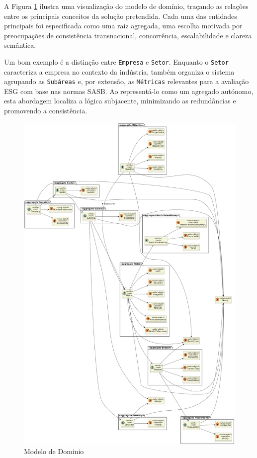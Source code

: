 A Figura \ref{fig:domain_model} ilustra uma visualização do modelo de domínio, traçando as relações entre os principais conceitos da solução pretendida. Cada uma das entidades principais foi especificada como uma raiz agregada, uma escolha motivada por preocupações de consistência transnacional, concorrência, escalabilidade e clareza semântica.

Um bom exemplo é a distinção entre \texttt{Empresa} e \texttt{Setor}. Enquanto o \texttt{Setor} caracteriza a empresa no contexto da indústria, também organiza o sistema agrupando as \texttt{Subáreas} e, por extensão, as \texttt{Métricas} relevantes para a avaliação ESG com base nas normas SASB. Ao representá-lo como um agregado autónomo, esta abordagem localiza a lógica subjacente, minimizando as redundâncias e promovendo a consistência.

\begin{figure}[H]
\centering
    \includegraphics[width=\linewidth,keepaspectratio]{frontmatter/assets/diagrams/Domain Model/Domain_Model2.png}
    \caption{Modelo de Dominio}
    \label{fig:domain_model}
\end{figure}


